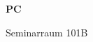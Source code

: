 \documentclass[a4paper]{article}
\begin{document}
\printGenericVSLHeader
\begin{center}
\begin{vsltext}{3cm}{4cm}

   \vspace{0.5cm} 

    \textbf{PC} 

    \vspace{1.5cm}

    Seminarraum 101B

\end{vsltext}

\end{center}
\end{document}
